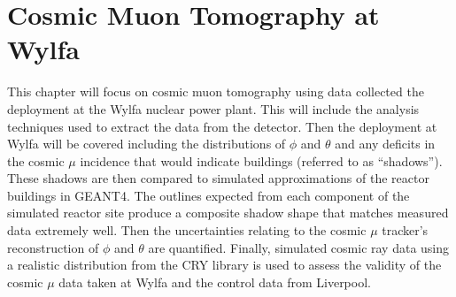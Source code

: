 
\chapter{Cosmic Muon Tomography at Wylfa}\label{chp:cosmicMuonTomography}

\ifpdf
    \graphicspath{{Chapter5/Figs/Raster/}{Chapter5/Figs/PDF/}{Chapter5/Figs/}}
\else
    \graphicspath{{Chapter5/Figs/Vector/}{Chapter5/Figs/}}
\fi

This chapter will focus on cosmic muon tomography using data collected the deployment at the Wylfa nuclear power plant. This will include the analysis techniques used to extract the data from the detector. Then the deployment at Wylfa will be covered including the distributions of $\phi$ and $\theta$ and any deficits in the cosmic $\mu$ incidence that would indicate buildings (referred to as ``shadows''). These shadows are then compared to simulated approximations of the reactor buildings in GEANT4. The outlines expected from each component of the simulated reactor site produce a composite shadow shape that matches measured data extremely well. Then the uncertainties relating to the cosmic $\mu$ tracker's reconstruction of $\phi$ and $\theta$ are quantified. Finally, simulated cosmic ray data using a realistic distribution from the CRY library is used to assess the validity of the cosmic $\mu$ data taken at Wylfa and the control data from Liverpool. 


